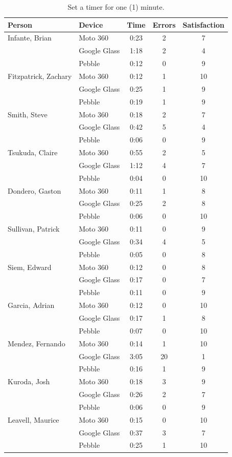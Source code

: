 \documentclass[11pt,a4paper]{scrartcl}
\begin{document}
\begin{appendices}
\begin{table}[h]
\caption{Set a timer for one (1) minute.} 
\centering
\begin{tabular}{@{}llccc@{}}
\toprule
Person & Device & Time & Errors & Satisfaction \\ \midrule
Infante, Brian & Moto 360 & 0:23 & 2 & 7 \\
 & Google Glass & 1:18 & 2 & 4 \\
 & Pebble & 0:12 & 0 & 9 \\
Fitzpatrick, Zachary & Moto 360 & 0:12 & 1 & 10 \\
 & Google Glass & 0:25 & 1 & 9 \\
 & Pebble & 0:19 & 1 & 9 \\
Smith, Steve & Moto 360 & 0:18 & 2 & 7 \\
 & Google Glass & 0:42 & 5 & 4 \\
 & Pebble & 0:06 & 0 & 9 \\
Tsukuda, Claire & Moto 360 & 0:55 & 2 & 5 \\
 & Google Glass & 1:12 & 4 & 7 \\
 & Pebble & 0:04 & 0 & 10 \\
Dondero, Gaston & Moto 360 & 0:11 & 1 & 8 \\
 & Google Glass & 0:25 & 2 & 8 \\
 & Pebble & 0:06 & 0 & 10 \\
Sullivan, Patrick & Moto 360 & 0:11 & 0 & 9 \\
 & Google Glass & 0:34 & 4 & 5 \\
 & Pebble & 0:05 & 0 & 8 \\
Siem, Edward & Moto 360 & 0:12 & 0 & 8 \\
 & Google Glass & 0:17 & 0 & 7 \\
 & Pebble & 0:11 & 0 & 9 \\
Garcia, Adrian & Moto 360 & 0:12 & 0 & 10 \\
 & Google Glass & 0:17 & 1 & 8 \\
 & Pebble & 0:07 & 0 & 10 \\
Mendez, Fernando & Moto 360 & 0:14 & 1 & 10 \\
 & Google Glass & 3:05 & 20 & 1 \\
 & Pebble & 0:16 & 1 & 9 \\
Kuroda, Josh & Moto 360 & 0:18 & 3 & 9 \\
 & Google Glass & 0:26 & 2 & 7 \\
 & Pebble & 0:06 & 0 & 9 \\
Leavell, Maurice & Moto 360 & 0:15 & 0 & 10 \\
 & Google Glass & 0:37 & 3 & 7 \\
 & Pebble & 0:25 & 1 & 10 \\ \bottomrule
\end{tabular}
\end{table}


\end{appendices}
\end{document}
